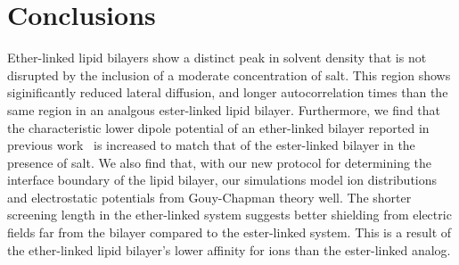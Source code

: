 \documentclass[12pt,preprint,times,openany,draft]{book}
\begin{document}
\chapter{Conclusions}
Ether-linked lipid bilayers show a distinct peak in solvent density
that is not disrupted by the inclusion of a moderate concentration of salt. This region
shows siginificantly reduced lateral diffusion, and longer autocorrelation times than the same
region in an analgous ester-linked lipid bilayer. Furthermore, we find that
the characteristic lower dipole potential of an ether-linked bilayer reported in previous work~\cite{kruczek:2017:ether} is 
increased to match that of the ester-linked bilayer in the presence of salt. We also find that,
with our new protocol for determining the interface boundary of the lipid bilayer,
our simulations model ion distributions and electrostatic potentials from Gouy-Chapman theory well. 
The shorter screening length in the
ether-linked system suggests better shielding from electric fields far 
from the bilayer compared to the ester-linked system. This is a result
of the ether-linked lipid bilayer's lower affinity for ions than the ester-linked analog.
\end{document}
